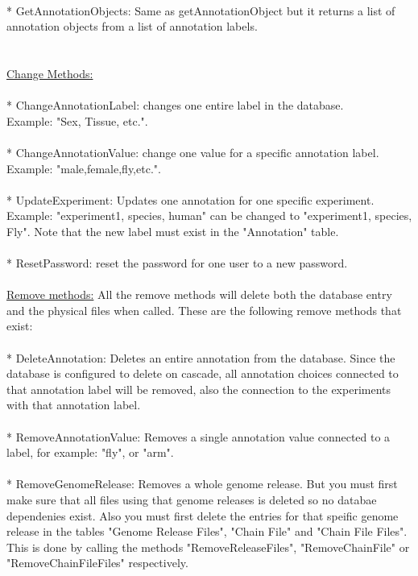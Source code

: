\\
* GetAnnotationObjects: Same as getAnnotationObject but it returns a list of annotation objects from a list of annotation labels.\\
\\
\\
\underline{Change Methods:}\\
\\
* ChangeAnnotationLabel: changes one entire label in the database.\\Example: "Sex, Tissue, etc.".\\
\\
* ChangeAnnotationValue: change one value for a specific annotation label.\\Example: "male,female,fly,etc.".\\
\\
* UpdateExperiment: Updates one annotation for one specific experiment. Example: "experiment1, species, human" can be changed to "experiment1, species, Fly". Note that the new label must exist in the "Annotation" table.\\
\\
* ResetPassword: reset the password for one user to a new password. \\
\\
\underline{Remove methods:} All the remove methods will delete both the database entry and the physical files when called. These are the following remove methods that exist:\\
\\
* DeleteAnnotation: Deletes an entire annotation from the database. Since the database is configured to delete on cascade, all annotation choices connected to that annotation label will be removed, also the connection to the experiments with that annotation label.\\
\\
* RemoveAnnotationValue: Removes a single annotation value connected to a label, for example: "fly", or "arm".\\
\\
* RemoveGenomeRelease: Removes a whole genome release. But you must first make sure that all files using that genome releases is deleted so no databae dependenies exist. Also you must first delete the entries for that speific genome release in the tables "Genome Release Files", "Chain File" and "Chain File Files". This is done by calling the methods "RemoveReleaseFiles", "RemoveChainFile" or "RemoveChainFileFiles" respectively. \\
